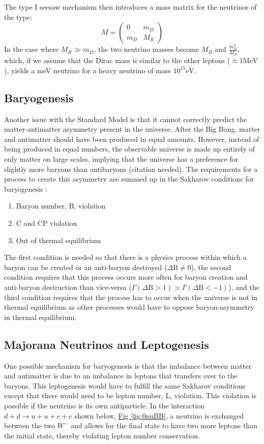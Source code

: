 \documentclass[12pt,a4paper]{article}
\begin{document}
The type I seesaw mechanism then introduces a mass matrix for the neutrinos of the type:
\begin{equation}
M =\begin{pmatrix}
0 & m_D \\
m_D & M_R
\end{pmatrix}
\end{equation}
In the case where $M_R \gg m_D$, the two neutrino masses become $M_R$ and $\frac{m_D^2}{M_R}$, which, if we assume that the Dirac mass is similar to the other leptons ($\approx 1 \textrm{MeV}$), yields a meV neutrino for a heavy neutrino of mass $10^{15} \textrm{eV}$.

\subsection{Baryogenesis}

Another issue with the Standard Model is that it cannot correctly predict the matter-antimatter asymmetry present in the universe. After the Big Bang, matter and antimatter should have been produced in equal amounts. However, instead of being produced in equal numbers, the observable universe is made up entirely of only matter on large scales, implying that the universe has a preference for slightly more baryons than antibaryons (\color{blue}citation needed\color{black}). The requirements for a process to create this asymmetry are summed up in the Sakharov conditions for baryogenesis \cite{Sakharov}:
\begin{enumerate}
\item Baryon number, B, violation
\item C and CP violation
\item Out of thermal equilibrium
\end{enumerate}
The first condition is needed so that there is a physics process within which a baryon can be created or an anti-baryon destroyed ($\Delta \textrm{B}\neq0$), the second condition requires that this process occurs more often for baryon creation and anti-baryon destruction than vice-versa ($\Gamma(\Delta \textrm{B}>1) > \Gamma(\Delta \textrm{B}<-1)$), and the third condition requires that the process has to occur when the universe is not in thermal equilibrium as other processes would have to oppose baryon-asymmetry in thermal equilibrium.

\subsection{Majorana Neutrinos and Leptogenesis}
One possible mechanism for baryogenesis is that the imbalance between matter and antimatter is due to an imbalance in leptons that transfers over to the baryons. This leptogenesis would have to fulfill the same Sakharov conditions except that there would need to be lepton number, L, violation. This violation is possible if the neutrino is its own antiparticle. In the interaction $d + d \rightarrow u + u + e + e$ shown below,  \hyperref[fig:0nuBB]{Fig \ref{fig:0nuBB}}, a neutrino is exchanged between the two $W^-$ and allows for the final state to have two more leptons than the initial state, thereby violating lepton number conservation.
\end{document}
